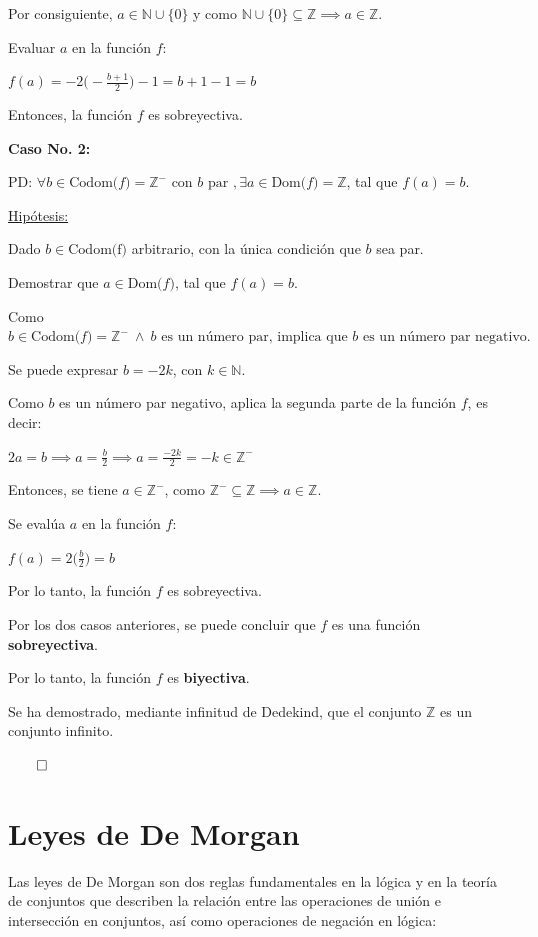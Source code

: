 \documentclass{article}
\begin{document}
Por consiguiente, $a \in \mathbb{N} \cup \{0\}$ y como $\mathbb{N} \cup \{0\} \subseteq \mathbb{Z} \implies a \in \mathbb{Z}$.

Evaluar $a$ en la función $f$:

$\displaystyle f(a) = -2\Big(-\frac{b + 1}{2}\Big) - 1 = b + 1 - 1 = b$

Entonces, la función $f$ es sobreyectiva.

\textbf{Caso No. 2:}

PD: $\forall b \in \text{Codom($f$)} = \mathbb{Z}^- \text{ con $b$ par }, \exists a \in \text{Dom($f$)} = \mathbb{Z}$, tal que $f(a) = b$.

\underline{Hipótesis:}

Dado $b \in \text{Codom(f)}$ arbitrario, con la única condición que $b$ sea par. 
  
Demostrar que $a \in \text{Dom($f$)}$, tal que $f(a) = b$.

Como $b \in \text{Codom($f$)} = \mathbb{Z}^- \ \land \ b \text{ es un número par, implica que $b$ es un número par negativo}.$

Se puede expresar $b = -2k$, con $k \in \mathbb{N}$.

Como $b$ es un número par negativo, aplica la segunda parte de la función $f$, es decir:

$\displaystyle 2a = b \implies a = \frac{b}{2} \implies a = \frac{-2k}{2} = -k \in \mathbb{Z}^-$

Entonces, se tiene $a \in \mathbb{Z}^-$, como $\mathbb{Z}^- \subseteq \mathbb{Z} \implies a \in \mathbb{Z}$.

Se evalúa $a$ en la función $f$:

$\displaystyle f(a) = 2\Big(\frac{b}{2}\Big) = b$

Por lo tanto, la función $f$ es sobreyectiva. 

Por los dos casos anteriores, se puede concluir que $f$ es una función \textbf{sobreyectiva}.

Por lo tanto, la función $f$ es \textbf{biyectiva}.

Se ha demostrado, mediante infinitud de Dedekind, que el conjunto $\mathbb{Z}$ es un conjunto infinito.

$\qed$

\section{Leyes de De Morgan}

Las leyes de De Morgan son dos reglas fundamentales en la lógica y en la teoría de conjuntos que describen la relación entre las operaciones de unión e intersección en conjuntos, así como operaciones de negación en lógica:
\end{document}
